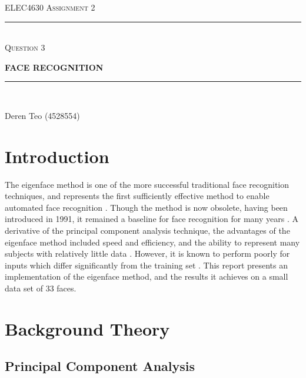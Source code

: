 \begin{titlepage}
  \centering

  \textsc{ELEC4630 Assignment 2}\\
  \vspace{9cm}

  \rule{\linewidth}{0.5pt}\\

  \vspace{1em}
  \LARGE\textsc{Question 3}\\
  \vspace{1em}

  \LARGE\uppercase{\textbf{{Face Recognition}}}\\

  \rule{\linewidth}{2pt}\\

  \vfill

  \normalsize{Deren Teo (4528554)}
  \vspace{1cm}

\end{titlepage}

\section{Introduction}

The eigenface method is one of the more successful traditional face recognition techniques, and represents the first sufficiently effective method to enable automated face recognition \cite{rosebrock_2021}. Though the method is now obsolete, having been introduced in 1991, it remained a baseline for face recognition for many years \cite{elec4630_2023}. A derivative of the principal component analysis technique, the advantages of the eigenface method included speed and efficiency, and the ability to represent many subjects with relatively little data \cite{turk_1991}. However, it is known to perform poorly for inputs which differ significantly from the training set \cite{turk_1991}. This report presents an implementation of the eigenface method, and the results it achieves on a small data set of 33 faces.

\section{Background Theory}

\subsection{Principal Component Analysis}

